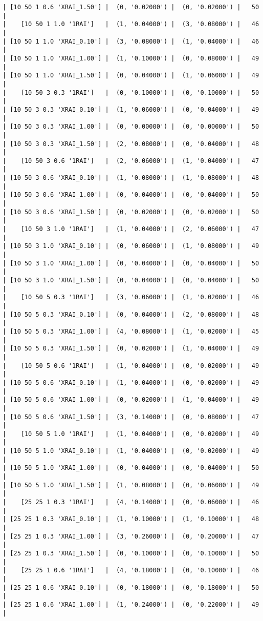 \documentclass{article}
\begin{document}
\begin{verbatim}
| [10 50 1 0.6 'XRAI_1.50'] |  (0, '0.02000') |  (0, '0.02000') |   50  |
|    [10 50 1 1.0 '1RAI']   |  (1, '0.04000') |  (3, '0.08000') |   46  |
| [10 50 1 1.0 'XRAI_0.10'] |  (3, '0.08000') |  (1, '0.04000') |   46  |
| [10 50 1 1.0 'XRAI_1.00'] |  (1, '0.10000') |  (0, '0.08000') |   49  |
| [10 50 1 1.0 'XRAI_1.50'] |  (0, '0.04000') |  (1, '0.06000') |   49  |
|    [10 50 3 0.3 '1RAI']   |  (0, '0.10000') |  (0, '0.10000') |   50  |
| [10 50 3 0.3 'XRAI_0.10'] |  (1, '0.06000') |  (0, '0.04000') |   49  |
| [10 50 3 0.3 'XRAI_1.00'] |  (0, '0.00000') |  (0, '0.00000') |   50  |
| [10 50 3 0.3 'XRAI_1.50'] |  (2, '0.08000') |  (0, '0.04000') |   48  |
|    [10 50 3 0.6 '1RAI']   |  (2, '0.06000') |  (1, '0.04000') |   47  |
| [10 50 3 0.6 'XRAI_0.10'] |  (1, '0.08000') |  (1, '0.08000') |   48  |
| [10 50 3 0.6 'XRAI_1.00'] |  (0, '0.04000') |  (0, '0.04000') |   50  |
| [10 50 3 0.6 'XRAI_1.50'] |  (0, '0.02000') |  (0, '0.02000') |   50  |
|    [10 50 3 1.0 '1RAI']   |  (1, '0.04000') |  (2, '0.06000') |   47  |
| [10 50 3 1.0 'XRAI_0.10'] |  (0, '0.06000') |  (1, '0.08000') |   49  |
| [10 50 3 1.0 'XRAI_1.00'] |  (0, '0.04000') |  (0, '0.04000') |   50  |
| [10 50 3 1.0 'XRAI_1.50'] |  (0, '0.04000') |  (0, '0.04000') |   50  |
|    [10 50 5 0.3 '1RAI']   |  (3, '0.06000') |  (1, '0.02000') |   46  |
| [10 50 5 0.3 'XRAI_0.10'] |  (0, '0.04000') |  (2, '0.08000') |   48  |
| [10 50 5 0.3 'XRAI_1.00'] |  (4, '0.08000') |  (1, '0.02000') |   45  |
| [10 50 5 0.3 'XRAI_1.50'] |  (0, '0.02000') |  (1, '0.04000') |   49  |
|    [10 50 5 0.6 '1RAI']   |  (1, '0.04000') |  (0, '0.02000') |   49  |
| [10 50 5 0.6 'XRAI_0.10'] |  (1, '0.04000') |  (0, '0.02000') |   49  |
| [10 50 5 0.6 'XRAI_1.00'] |  (0, '0.02000') |  (1, '0.04000') |   49  |
| [10 50 5 0.6 'XRAI_1.50'] |  (3, '0.14000') |  (0, '0.08000') |   47  |
|    [10 50 5 1.0 '1RAI']   |  (1, '0.04000') |  (0, '0.02000') |   49  |
| [10 50 5 1.0 'XRAI_0.10'] |  (1, '0.04000') |  (0, '0.02000') |   49  |
| [10 50 5 1.0 'XRAI_1.00'] |  (0, '0.04000') |  (0, '0.04000') |   50  |
| [10 50 5 1.0 'XRAI_1.50'] |  (1, '0.08000') |  (0, '0.06000') |   49  |
|    [25 25 1 0.3 '1RAI']   |  (4, '0.14000') |  (0, '0.06000') |   46  |
| [25 25 1 0.3 'XRAI_0.10'] |  (1, '0.10000') |  (1, '0.10000') |   48  |
| [25 25 1 0.3 'XRAI_1.00'] |  (3, '0.26000') |  (0, '0.20000') |   47  |
| [25 25 1 0.3 'XRAI_1.50'] |  (0, '0.10000') |  (0, '0.10000') |   50  |
|    [25 25 1 0.6 '1RAI']   |  (4, '0.18000') |  (0, '0.10000') |   46  |
| [25 25 1 0.6 'XRAI_0.10'] |  (0, '0.18000') |  (0, '0.18000') |   50  |
| [25 25 1 0.6 'XRAI_1.00'] |  (1, '0.24000') |  (0, '0.22000') |   49  |

\end{verbatim}
\end{document}
